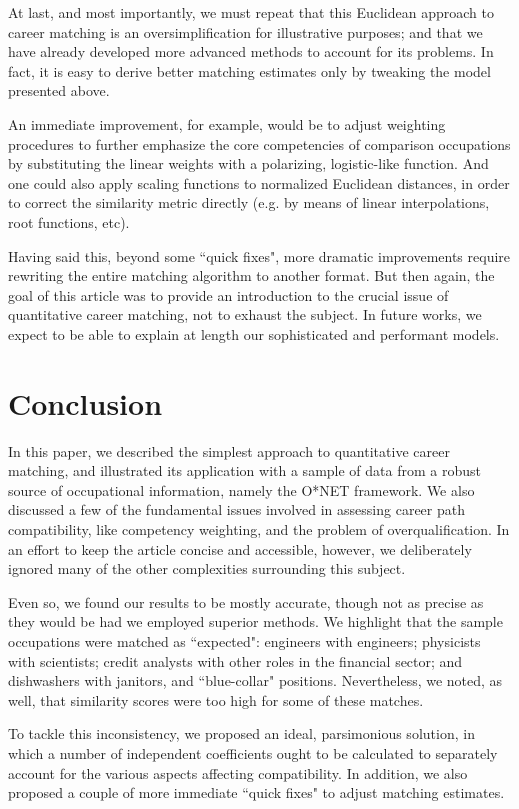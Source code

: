 \documentclass{article}
\begin{document}
At last, and most importantly, we must repeat that this Euclidean approach to
career matching is an oversimplification for illustrative purposes; and that we
have already developed more advanced methods to account for its problems. In
fact, it is easy to derive better matching estimates only by tweaking the model
presented above.

An immediate improvement, for example, would be to adjust weighting procedures
to further emphasize the core competencies of comparison occupations by
substituting the linear weights with a polarizing, logistic-like function. And
one could also apply scaling functions to normalized Euclidean distances, in
order to correct the similarity metric directly (e.g. by means of linear
interpolations, root functions, etc).

Having said this, beyond some ``quick fixes", more dramatic improvements
require rewriting the entire matching algorithm to another format. But then
again, the goal of this article was to provide an introduction to the crucial
issue of quantitative career matching, not to exhaust the subject. In future
works, we expect to be able to explain at length our sophisticated and
performant models.

\section{Conclusion}
In this paper, we described the simplest approach to quantitative career
matching, and illustrated its application with a sample of data from a robust
source of occupational information, namely the O*NET framework. We also
discussed a few of the fundamental issues involved in assessing career path
compatibility, like competency weighting, and the problem of overqualification.
In an effort to keep the article concise and accessible, however, we
deliberately ignored many of the other complexities surrounding this subject.

Even so, we found our results to be mostly accurate, though not as precise as
they would be had we employed superior methods. We highlight that the sample
occupations were matched as ``expected": engineers with engineers; physicists
with scientists; credit analysts with other roles in the financial sector; and
dishwashers with janitors, and ``blue-collar" positions. Nevertheless, we
noted, as well, that similarity scores were too high for some of these matches.

To tackle this inconsistency, we proposed an ideal, parsimonious solution, in
which a number of independent coefficients ought to be calculated to separately
account for the various aspects affecting compatibility. In addition, we also
proposed a couple of more immediate ``quick fixes" to adjust matching
estimates.
\end{document}
